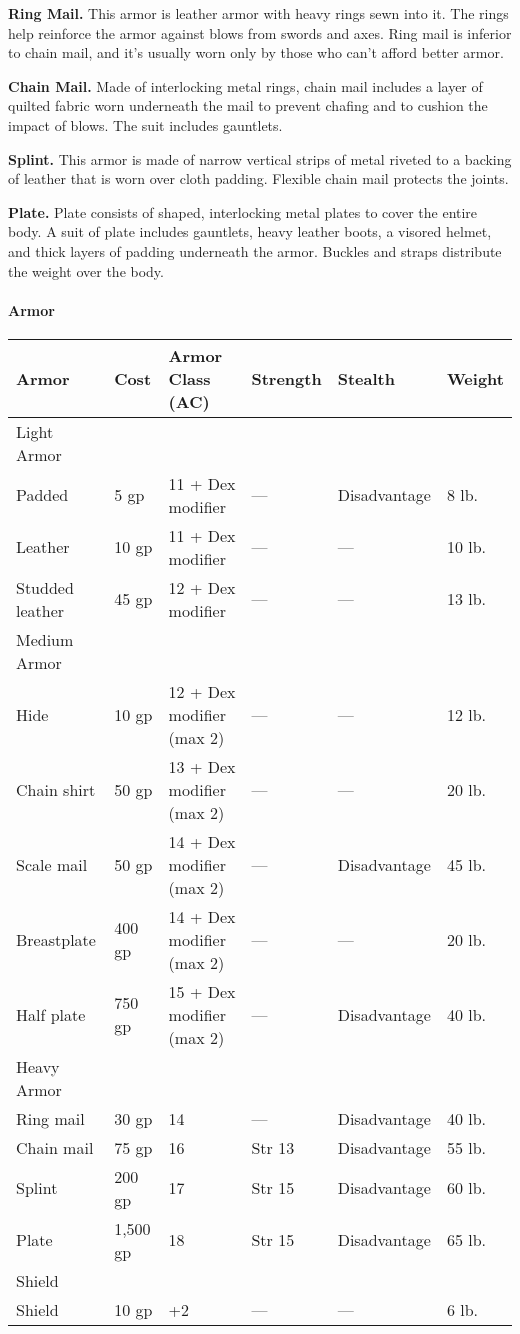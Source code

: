 \documentclass[
]{article}
\begin{document}
\textbf{Ring Mail.} This armor is leather armor with heavy rings sewn
into it. The rings help reinforce the armor against blows from swords
and axes. Ring mail is inferior to chain mail, and it's usually worn
only by those who can't afford better armor.

\textbf{Chain Mail.} Made of interlocking metal rings, chain mail
includes a layer of quilted fabric worn underneath the mail to prevent
chafing and to cushion the impact of blows. The suit includes gauntlets.

\textbf{Splint.} This armor is made of narrow vertical strips of metal
riveted to a backing of leather that is worn over cloth padding.
Flexible chain mail protects the joints.

\textbf{Plate.} Plate consists of shaped, interlocking metal plates to
cover the entire body. A suit of plate includes gauntlets, heavy leather
boots, a visored helmet, and thick layers of padding underneath the
armor. Buckles and straps distribute the weight over the body.

\hypertarget{armor-1}{%
\paragraph{Armor}\label{armor-1}}

\begin{longtable}[]{@{}llllll@{}}
\toprule
Armor & Cost & Armor Class (AC) & Strength & Stealth &
Weight\tabularnewline
\midrule
\endhead
Light Armor & & & & &\tabularnewline
Padded & 5 gp & 11 + Dex modifier & --- & Disadvantage & 8
lb.\tabularnewline
Leather & 10 gp & 11 + Dex modifier & --- & --- & 10 lb.\tabularnewline
Studded leather & 45 gp & 12 + Dex modifier & --- & --- & 13
lb.\tabularnewline
Medium Armor & & & & &\tabularnewline
Hide & 10 gp & 12 + Dex modifier (max 2) & --- & --- & 12
lb.\tabularnewline
Chain shirt & 50 gp & 13 + Dex modifier (max 2) & --- & --- & 20
lb.\tabularnewline
Scale mail & 50 gp & 14 + Dex modifier (max 2) & --- & Disadvantage & 45
lb.\tabularnewline
Breastplate & 400 gp & 14 + Dex modifier (max 2) & --- & --- & 20
lb.\tabularnewline
Half plate & 750 gp & 15 + Dex modifier (max 2) & --- & Disadvantage &
40 lb.\tabularnewline
Heavy Armor & & & & &\tabularnewline
Ring mail & 30 gp & 14 & --- & Disadvantage & 40 lb.\tabularnewline
Chain mail & 75 gp & 16 & Str 13 & Disadvantage & 55 lb.\tabularnewline
Splint & 200 gp & 17 & Str 15 & Disadvantage & 60 lb.\tabularnewline
Plate & 1,500 gp & 18 & Str 15 & Disadvantage & 65 lb.\tabularnewline
Shield & & & & &\tabularnewline
Shield & 10 gp & +2 & --- & --- & 6 lb.\tabularnewline
\bottomrule
\end{longtable}
\end{document}
